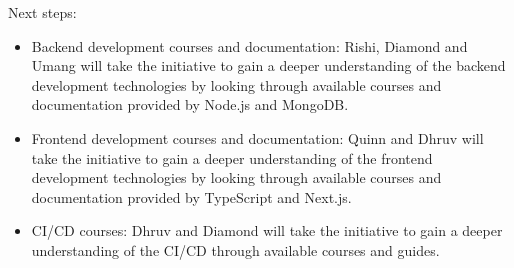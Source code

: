 \documentclass[12pt]{article}
\begin{document}
Next steps:
\begin{itemize}
    \item Backend development courses and documentation: Rishi, Diamond and Umang will take the initiative to gain a deeper understanding of the backend development technologies by looking through available courses and documentation provided by Node.js and MongoDB.
    \item Frontend development courses and documentation: Quinn and Dhruv will take the initiative to gain a deeper understanding of the frontend development technologies by looking through available courses and documentation provided by TypeScript and Next.js.
    \item CI/CD courses: Dhruv and Diamond will take the initiative to gain a deeper understanding of the CI/CD through available courses and guides.
\end{itemize}
\end{document}
